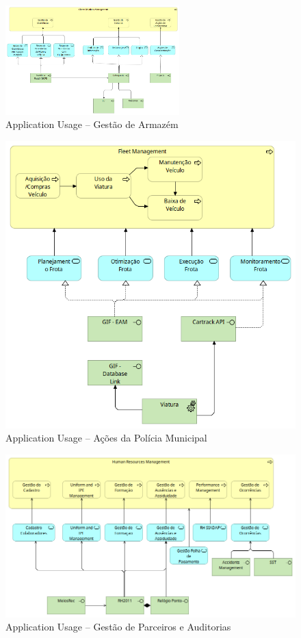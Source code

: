 \documentclass[12pt,a4paper,final]{article}
\begin{document}
    \begin{figure}[H]
        \centering
        \includegraphics[width=0.6\textwidth]{Q10_2}
        \caption{Application Usage – Gestão de Armazém}
        \label{fig:q10_2}
    \end{figure}

    \begin{figure}[H]
        \centering
        \includegraphics[width=\textwidth]{Q10_3}
        \caption{Application Usage – Ações da Polícia Municipal}
        \label{fig:q10_3}
    \end{figure}

    \begin{figure}[H]
        \centering
        \includegraphics[width=\textwidth]{Q10_4}
        \caption{Application Usage – Gestão de Parceiros e Auditorias}
        \label{fig:q10_4}
    \end{figure}
\end{document}
